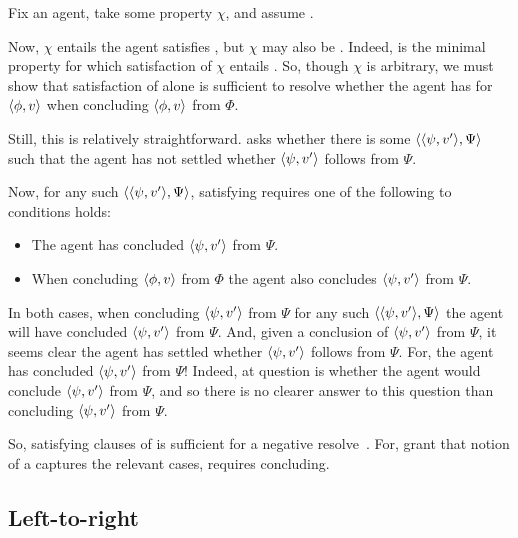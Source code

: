 \begin{note}
  Fix an agent, take some property \(\chi\), and assume .

  Now, \(\chi\) entails the agent satisfies \iZS{}, but \(\chi\) may also be \ZS{}.
  Indeed, \ZS{} is the minimal property for which satisfaction of \(\chi\) entails \ZS{}.
  So, though \(\chi\) is arbitrary, we must show that satisfaction of \ZS{} alone is sufficient to resolve whether the agent has \zS{} for \(\langle \phi, v \rangle\) when concluding \(\langle \phi, v \rangle\) from \(\Phi\).

  Still, this is relatively straightforward.
  \qzS{} asks whether there is some \requ{} \(\langle \langle \psi, v' \rangle, \Psi \rangle\) such that the agent has not settled whether \(\langle \psi, v' \rangle\) follows from \(\Psi\).

  Now, for any such \(\langle \langle \psi, v' \rangle, \Psi \rangle\), satisfying \iZS{} requires one of the following to conditions holds:
  \begin{itemize}
  \item
    The agent has concluded \(\langle \psi, v' \rangle\) from \(\Psi\).
  \item
    When concluding \(\langle \phi, v \rangle\) from \(\Phi\) the agent also concludes \(\langle \psi, v' \rangle\) from \(\Psi\).
  \end{itemize}
  In both cases, when concluding \(\langle \psi, v' \rangle\) from \(\Psi\) for any such \(\langle \langle \psi, v' \rangle, \Psi \rangle\) the agent will have concluded \(\langle \psi, v' \rangle\) from \(\Psi\).
  And, given a conclusion of \(\langle \psi, v' \rangle\) from \(\Psi\), it seems clear the agent has settled whether \(\langle \psi, v' \rangle\) follows from \(\Psi\).
  For, the agent has concluded \(\langle \psi, v' \rangle\) from \(\Psi\)!
  Indeed, at question is whether the agent would conclude \(\langle \psi, v' \rangle\) from \(\Psi\), and so there is no clearer answer to this question than concluding \(\langle \psi, v' \rangle\) from \(\Psi\).

  So, satisfying clauses of \iZS{} is sufficient for a negative resolve~\qzS{}.
  For, grant that notion of a  captures the relevant cases, \iZS{} requires concluding.
\end{note}

\subsection{Left-to-right}

